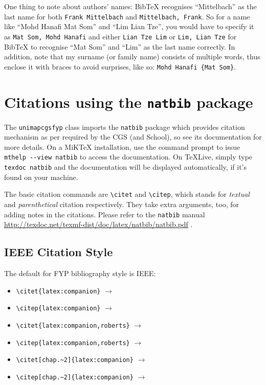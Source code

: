 One thing to note about authors' names: Bib\TeX{} recognises ``Mittelbach'' as the last name for both \texttt{Frank Mittelbach} and \texttt{Mittelbach, Frank}.  So for a name like ``Mohd Hanafi Mat Som'' and ``Lim Lian Tze'', you would have to specify it as \texttt{Mat Som, Mohd Hanafi} and either \texttt{Lian Tze Lim} or \texttt{Lim, Lian Tze} for Bib\TeX{} to recognise ``Mat Som'' and ``Lim'' as the last name correctly.  In addition, note that my surname (or family name) consists of multiple words, thus enclose it with braces to avoid surprises, like so: \texttt{Mohd Hanafi \{Mat Som\}}.

\section{Citations using the \texttt{natbib} package}
The \verb|unimapcgsfyp| class imports the \verb|natbib| package which provides citation mechanism as per required by the CGS (and School), so see its documentation for more details.  On a MiK\TeX{} installation,
use the command prompt to issue \lstinline|mthelp --view natbib| to access the documentation.
On TeXLive, simply type \verb|texdoc natbib| and the documentation will be displayed automatically, if it's found on your machine.

The basic citation commands are \verb|\citet| and \verb|\citep|, which stands for \emph{textual} and \emph{parenthetical} citation respectively.  They take extra arguments, too, for adding notes in the citations.  Please refer to the \verb|natbib| manual \url{http://texdoc.net/texmf-dist/doc/latex/natbib/natbib.pdf} \cite{cgs:thesis:guideline:2017,latex:companion,lim:2007,lim:latextypesetting}. 

\subsection{IEEE Citation Style}
The default for FYP bibliography style is IEEE:

\begin{itemize}[nosep]\singlespacing
	\item \verb|\citet{latex:companion}| $\to$ \citet{latex:companion}
	\item \verb|\citep{latex:companion}| $\to$ \citep{latex:companion}
	\item \verb|\citet{latex:companion,roberts}| $\to$ \citet{latex:companion,roberts}
	\item \verb|\citep{latex:companion,roberts}| $\to$ \citep{latex:companion,roberts}
	\item \verb|\citet[chap.~2]{latex:companion}| $\to$ \citet[chap.~2]{latex:companion}
	\item \verb|\citep[chap.~2]{latex:companion}| $\to$ \citep[chap.~2]{latex:companion}
\end{itemize}

